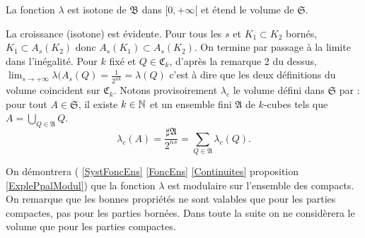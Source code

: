 \begin{propn}
  La fonction $\lambda$ est isotone de $\mathfrak{B}$ dans $[0, + \infty[$ et étend le volume de $\mathfrak{S}$.
\end{propn}
\begin{demo}
 La croissance (isotone) est évidente. Pour tous les $s$ et $K_1 \subset K_2$ bornés, $K_1 \subset A_s(K_2)$ donc $A_s(K_1) \subset A_s(K_2)$. On termine par passage à la limite dans l'inégalité.\newline
 Pour $k$ fixé et $Q\in \mathfrak{C}_k$, d'après la remarque 2 du dessus, $\lim_{s\rightarrow +\infty} \lambda(A_s(Q) = \frac{1}{2^{nk}}=\lambda(Q)$ c'est à dire que les deux définitions du volume coincident sur $\mathfrak{C}_k$.\newline
 Notons provisoirement $\lambda_c$ le volume défini dans $\mathfrak{S}$ par : pour tout $A \in \mathfrak{S}$, il existe $k\in \mathbb{N}$ et un ensemble fini $\mathfrak{A}$ de $k$-cubes tels que $A = \bigcup_{Q\in \mathfrak{A}} Q$.
\begin{displaymath}
 \lambda_c(A) = \frac{\sharp \mathfrak{A}}{2^{ns}} = \sum_{Q\in \mathfrak{A}} \lambda_c(Q).
\end{displaymath}
\end{demo}
 \noindent On démontrera ( \ref{SystFoncEns} \ref{FoncEns} \ref{Continuites} proposition \ref{ExplePpalModul}) que la fonction $\lambda$ est modulaire sur l'ensemble des compacts. On remarque que les bonnes propriétés ne sont valables que pour les parties compactes, pas pour les parties bornées. Dans toute la suite on ne considèrera le volume que pour les parties compactes.

